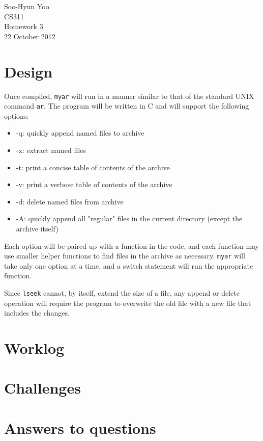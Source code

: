 \documentclass[12pt,letterpaper]{article}
\begin{document}
Soo-Hyun Yoo \\
CS311 \\
Homework 3 \\
22 October 2012


\section*{Design}

Once compiled, {\tt myar} will run in a manner similar to that of the standard
UNIX command {\tt ar}. The program will be written in C and will support the
following options:

\begin{itemize}
	\item -q: quickly append named files to archive
	\item -x: extract named files
	\item -t: print a concise table of contents of the archive
	\item -v: print a verbose table of contents of the archive
	\item -d: delete named files from archive
	\item -A: quickly append all "regular" files in the current directory
		(except the archive itself)
\end{itemize}

Each option will be paired up with a function in the code, and each function may use smaller helper functions to find files in the archive as necessary. {\tt myar} will take only one option at a time, and a switch statement will run the appropriate function.

Since {\tt lseek} cannot, by itself, extend the size of a file, any append or delete operation will require the program to overwrite the old file with a new file that includes the changes.


\section*{Worklog}


\section*{Challenges}


\section*{Answers to questions}
\end{document}

